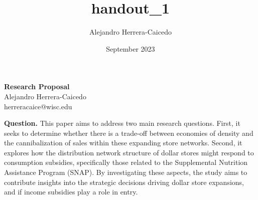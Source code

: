 \documentclass[11pt]{article}
\title{handout_1}
\author{Alejandro Herrera-Caicedo}
\date{September 2023}
\begin{document}
	
	
	

\begin{center}
	\large\textbf{}
\end{center}
\renewcommand\labelitemi{--}

\vspace{-25mm}


\begin{center}
\Large \textbf{Research Proposal} \vspace{3pt}\\
\normalsize Alejandro Herrera-Caicedo  \\ \tiny herreracaice@wisc.edu
\end{center}




 

\textbf{Question.} This paper aims to address two main research questions. First, it seeks to determine whether there is a trade-off between economies of density and the cannibalization of sales within these expanding store networks. Second, it explores how the distribution network structure of dollar stores might respond to consumption subsidies, specifically those related to the Supplemental Nutrition Assistance Program (SNAP). By investigating these aspects, the study aims to contribute insights into the strategic decisions driving dollar store expansions, and if income subsidies play a role in entry.
\end{document}
